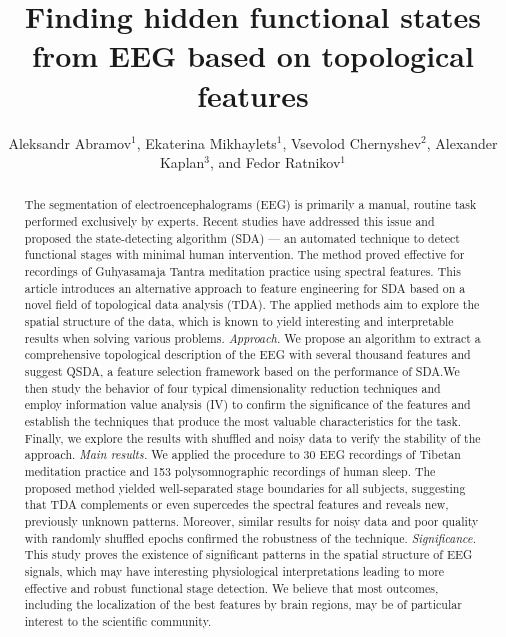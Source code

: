 \documentclass[10pt]{iopart}
\begin{document}
\title[Finding hidden functional states from EEG based on topological features]
        {Finding hidden functional states from EEG based on topological features}

\author{Aleksandr Abramov$^1$, Ekaterina Mikhaylets$^1$, Vsevolod Chernyshev$^2$, Alexander Kaplan$^3$, and Fedor Ratnikov$^1$}

\address{$^1$ Faculty of Computer Science, HSE University, Moscow, Russia}
\address{$^2$ Ulm University, Ulm, Germany}
\address{$^3$ Lomonosov Moscow State University, Moscow, Russia}


\begin{abstract}

The segmentation of electroencephalograms (EEG) is primarily a manual, routine task performed exclusively by experts. Recent studies have addressed this issue and proposed the state-detecting algorithm (SDA) --- an automated technique to detect functional stages with minimal human intervention. The method proved effective for recordings of Guhyasamaja Tantra meditation practice using spectral features. This article introduces an alternative approach to feature engineering for SDA based on a novel field of topological data analysis (TDA). The applied methods aim to explore the spatial structure of the data, which is known to yield interesting and interpretable results when solving various problems.
\textit{Approach.}
We propose an algorithm to extract a comprehensive topological description of the EEG with several thousand features and suggest QSDA, a feature selection framework based on the performance of SDA.\@ We then study the behavior of four typical dimensionality reduction techniques and employ information value analysis (IV) to confirm the significance of the features and establish the techniques that produce the most valuable characteristics for the task. Finally, we explore the results with shuffled and noisy data to verify the stability of the approach.
\textit{Main results.}
We applied the procedure to 30 EEG recordings of Tibetan meditation practice and 153 polysomnographic recordings of human sleep. The proposed method yielded well-separated stage boundaries for all subjects, suggesting that TDA complements or even supercedes the spectral features and reveals new, previously unknown patterns. Moreover, similar results for noisy data and poor quality with randomly shuffled epochs confirmed the robustness of the technique.
\textit{Significance.}
This study proves the existence of significant patterns in the spatial structure of EEG signals, which may have interesting physiological interpretations leading to more effective and robust functional stage detection. We believe that most outcomes, including the localization of the best features by brain regions, may be of particular interest to the scientific community.

\end{abstract}
\end{document}
